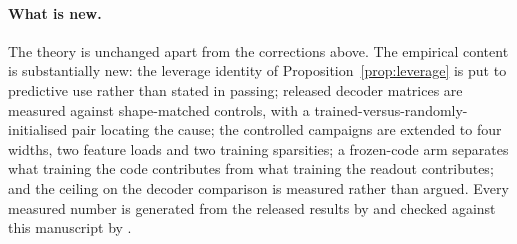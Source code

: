 \paragraph{What is new.} The theory is unchanged apart from the corrections above. The empirical
content is substantially new: the leverage identity of Proposition~\ref{prop:leverage} is put to
predictive use rather than stated in passing; \SaeDicts{} released decoder matrices are measured
against shape-matched controls, with a trained-versus-randomly-initialised pair locating the cause;
the controlled campaigns are extended to four widths, two feature loads and two training sparsities;
a frozen-code arm separates what training the code contributes from what training the readout
contributes; and the ceiling on the decoder comparison is measured rather than argued. Every measured
number is generated from the released results by  and checked against
this manuscript by .
